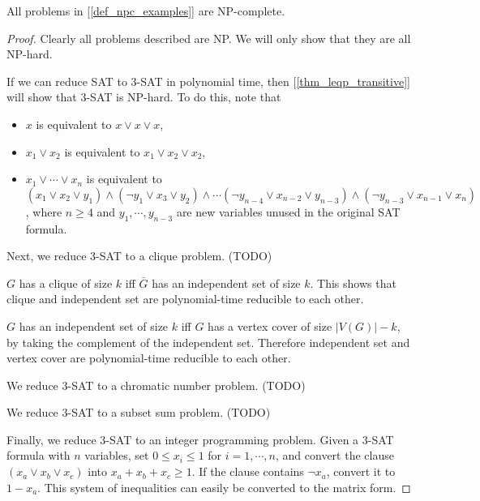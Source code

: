         \begin{thm} \label{thm_npc_examples}
            All problems in [\ref{def_npc_examples}] are NP-complete.
        \end{thm}
        
        \begin{proof}
        Clearly all problems described are NP. We will only show that they are all NP-hard.
        
        If we can reduce SAT to 3-SAT in polynomial time, then [\ref{thm_leqp_transitive}] will show that 3-SAT is NP-hard. To do this, note that \begin{itemize}
            \item $x$ is equivalent to $x \vee x \vee x$,
            \item $x_1 \vee x_2$ is equivalent to $x_1 \vee x_2 \vee x_2$,
            \item $x_1 \vee \cdots \vee x_n$ is equivalent to $(x_1 \vee x_2 \vee y_1) \wedge (\neg y_1 \vee x_3 \vee y_2) \wedge \cdots (\neg y_{n-4} \vee x_{n-2} \vee y_{n-3}) \wedge (\neg y_{n-3} \vee x_{n-1} \vee x_{n})$, where $n \geq 4$ and $y_1,\cdots,y_{n-3}$ are new variables unused in the original SAT formula.
        \end{itemize}
        
        Next, we reduce 3-SAT to a clique problem. (TODO)
        
        $G$ has a clique of size $k$ iff $\bar{G}$ has an independent set of size $k$. This shows that clique and independent set are polynomial-time reducible to each other.
        
        $G$ has an independent set of size $k$ iff $G$ has a vertex cover of size $|V(G)| - k$, by taking the complement of the independent set. Therefore independent set and vertex cover are polynomial-time reducible to each other.
        
        We reduce 3-SAT to a chromatic number problem. (TODO)
        
        We reduce 3-SAT to a subset sum problem. (TODO)
        
        Finally, we reduce 3-SAT to an integer programming problem. Given a 3-SAT formula with $n$ variables, set $0 \leq x_i \leq 1$ for $i=1,\cdots,n$, and convert the clause $(x_a \vee x_b \vee x_c)$ into $x_a + x_b + x_c \geq 1$. If the clause contains $\neg x_a$, convert it to $1-x_a$. This system of inequalities can easily be converted to the matrix form.
        
        \end{proof}
